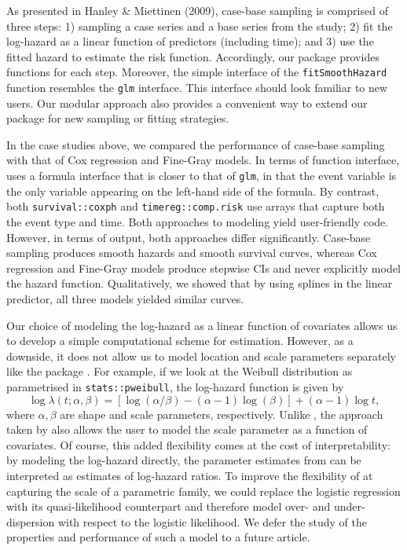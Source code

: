 As presented in Hanley \& Miettinen (2009), case-base sampling is comprised of three steps: 1) sampling a case series and a base series from the study; 2) fit the log-hazard as a linear function of predictors (including time); and 3) use the fitted hazard to estimate the risk function. Accordingly, our package provides functions for each step. Moreover, the simple interface of the \texttt{fitSmoothHazard} function resembles the \texttt{glm} interface. This interface should look familiar to new users. Our modular approach also provides a convenient way to extend our package for new sampling or fitting strategies.

In the case studies above, we compared the performance of case-base sampling with that of Cox regression and Fine-Gray models. In terms of function interface,  uses a formula interface that is closer to that of \texttt{glm}, in that the event variable is the only variable appearing on the left-hand side of the formula. By contrast, both \texttt{survival::coxph} and \texttt{timereg::comp.risk} use arrays that capture both the event type and time. Both approaches to modeling yield user-friendly code. However, in terms of output, both approaches differ significantly. Case-base sampling produces smooth hazards and smooth survival curves, whereas Cox regression and Fine-Gray models produce stepwise CIs and never explicitly model the hazard function. Qualitatively, we showed that by using splines in the linear predictor, all three models yielded similar curves.

Our choice of modeling the log-hazard as a linear function of covariates allows us to develop a simple computational scheme for estimation. However, as a downside, it does not allow us to model location and scale parameters separately like the package . For example, if we look at the Weibull distribution as parametrised in \texttt{stats::pweibull}, the log-hazard function is given by
\[ \log \lambda(t; \alpha, \beta) = \left[\log(\alpha/\beta) - (\alpha - 1)\log(\beta)\right] + (\alpha - 1)\log t,\]
where \(\alpha,\beta\) are shape and scale parameters, respectively. Unlike , the approach taken by  also allows the user to model the scale parameter as a function of covariates. Of course, this added flexibility comes at the cost of interpretability: by modeling the log-hazard directly, the parameter estimates from  can be interpreted as estimates of log-hazard ratios. To improve the flexibility of  at capturing the scale of a parametric family, we could replace the logistic regression with its quasi-likelihood counterpart and therefore model over- and under-dispersion with respect to the logistic likelihood. We defer the study of the properties and performance of such a model to a future article.

